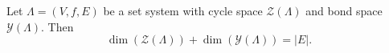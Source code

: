 Let $\Lambda = (V, f, E)$ be a set system with cycle space $\mathcal{Z}(\Lambda)$ and bond space $\mathcal{Y}(\Lambda)$. Then
$$\dim(\mathcal{Z}(\Lambda)) + \dim(\mathcal{Y}(\Lambda)) = |E|.$$
